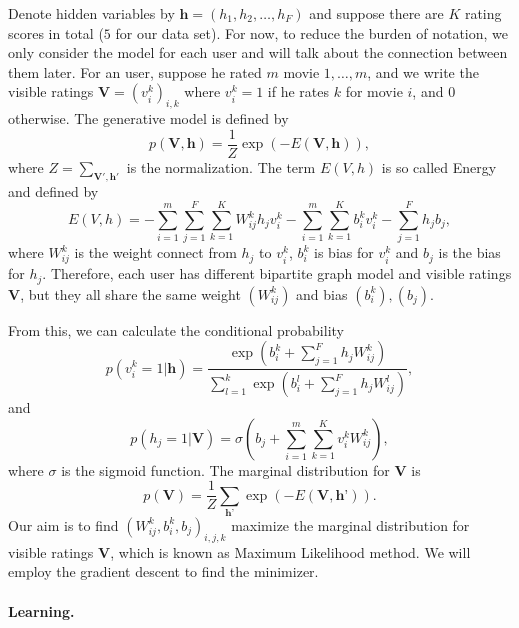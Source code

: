 \documentclass[bj, preprint]{imsart}
\begin{document}
Denote hidden variables by $\textbf{h} = (h_1, h_2,\dots, h_F)$ and suppose there are $K$ rating scores in total ($5$ for our data set). For now, to reduce the burden of notation, we only consider the model for each user and will talk about the connection between them later. For an user, suppose he rated $m$ movie $1, \dots, m$, and we write the visible ratings $\textbf{V} = (v_i^k)_{i,k}$ where $v_i^k = 1$ if he rates $k$ for movie $i$, and $0$ otherwise. The generative model is defined by
\begin{equation}\label{GenModelRBM}
p(\textbf{V}, \textbf{h}) = \dfrac{1}{Z} \exp(-E(\textbf{V}, \textbf{h})),
\end{equation}
where $Z = \sum_{\textbf{V}', \textbf{h}'}$ is the normalization. The term $E(V, h)$ is so called Energy and defined by
\begin{equation}\label{EnergyRBM}
E(V,h) = - \sum_{i=1}^{m} \sum_{j=1}^{F} \sum_{k=1}^{K} W_{ij}^k h_j v_i^k - \sum_{i=1}^{m} \sum_{k=1}^{K} b_i^k v_i^k - \sum_{j=1}^{F} h_j b_j,
\end{equation}
where $W_{ij}^k$ is the weight connect from $h_j$ to $v_i^k$, $b_i^k$ is bias for $v_i^k$ and $b_j$ is the bias for $h_j$. Therefore, each user has different bipartite graph model and visible ratings $\textbf{V}$, but they all share the same weight $(W_{ij}^k)$ and bias $(b_i^k), (b_j)$.   

From this, we can calculate the conditional probability 
\begin{equation}\label{pv|h}
p(v_i^k = 1| \textbf{h}) = \dfrac{\exp(b_{i}^{k} + \sum_{j=1}^{F} h_j W_{ij}^k)}{\sum_{l=1}^{k} \exp(b_{i}^{l} + \sum_{j=1}^{F} h_j W_{ij}^l)}, 
\end{equation}
and
\begin{equation}\label{ph|v}
p(h_j = 1 | \textbf{V}) = \sigma(b_j + \sum_{i=1}^{m}\sum_{k=1}^{K} v_i^k W_{ij}^{k}),
\end{equation}
where $\sigma$ is the sigmoid function. The marginal distribution for $\textbf{V}$ is
$$p(\textbf{V}) = \dfrac{1}{Z} \sum_{\textbf{h'}} \exp(-E(\textbf{V}, \textbf{h'})).$$
Our aim is to find $(W_{ij}^{k}, b_{i}^{k}, b_j)_{i,j,k}$ maximize the marginal distribution for visible ratings $\textbf{V}$, which is known as Maximum Likelihood method. We will employ the gradient descent to find the minimizer. 

\paragraph{Learning.}\label{par:method.models.rbm.learning}
\end{document}
